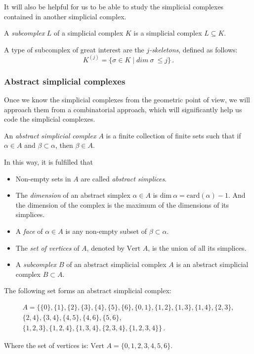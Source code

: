 \documentclass[../main.tex]{subfiles}
\begin{document}
It will also be helpful for us to be able to study the simplicial complexes contained in another simplicial complex.
\begin{definition}
A \emph{subcomplex} $L$ of a simplicial complex $K$ is a simplicial complex $L \subseteq K$.
\end{definition}

A type of subcomplex of great interest are the \emph{$j$-skeletons}, defined as follows: \[K^{(j)} = \{\sigma \in K \mid dim\ \sigma\ \leq j \}\,.\]

\subsubsection*{Abstract simplicial complexes}
Once we know the simplicial complexes from the geometric point of view, we will approach them from a combinatorial approach, which will significantly help us code the simplicial complexes.

\begin{definition}
An \emph{abstract simplicial complex $A$} is a finite collection of finite sets such that if $\alpha \in A$ and $\beta \subset \alpha$, then $\beta \in A$.
\end{definition}
In this way, it is fulfilled that
\begin{itemize}
    \item Non-empty sets in $A$ are called \emph{abstract simplices}.
    \item The \emph{dimension} of an abstract simplex $\alpha \in A$ is $\text{dim}\ \alpha = \text{card}(\alpha) - 1$. And the dimension of the complex is the maximum of the dimensions of its simplices.
    \item A \emph{face} of $\alpha \in A$ is any non-empty subset of $\beta \subset \alpha$.
    \item The \emph{set of vertices} of $A$, denoted by $\text{Vert } A$, is the union of all its simplices.
    \item A \emph{subcomplex $B$} of an abstract simplicial complex $A$ is an abstract simplicial complex $B \subset A$.
\end{itemize}

\begin{exmp}
The following set forms an abstract simplicial complex:

\begin{gather*}
A = \{\{0\},\{1\},\{2\},\{3\},\{4\},\{5\},\{6\},\{0,1\},\{1,2\},\{1,3\},\{1,4\},\{2,3\},\\
\{2,4\},\{3,4\},\{4,5\},\{4,6\},\{5,6\},\\
\{1,2,3\},\{1,2,4\},\{1,3,4\},\{2,3,4\},\{1,2,3,4\}\}\,.
\end{gather*}

Where the set of vertices is: $\text{Vert }A = \{0, 1, 2, 3, 4, 5, 6\}$.
\end{exmp}
\end{document}
